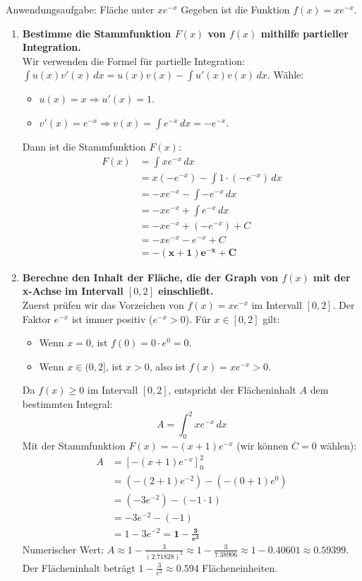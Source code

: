 \begin{loesungsumgebung}{Anwendungsaufgabe: Fläche unter $xe^{-x}$}
Gegeben ist die Funktion $f(x) = xe^{-x}$.

\begin{enumerate}[label=(\alph*)]
    \item \textbf{Bestimme die Stammfunktion $F(x)$ von $f(x)$ mithilfe partieller Integration.} \\
    Wir verwenden die Formel für partielle Integration: $\int u(x)v'(x) \,dx = u(x)v(x) - \int u'(x)v(x) \,dx$.
    Wähle:
    \begin{itemize}
        \item $u(x) = x \Rightarrow u'(x) = 1$.
        \item $v'(x) = e^{-x} \Rightarrow v(x) = \int e^{-x} \,dx = -e^{-x}$.
    \end{itemize}
    Dann ist die Stammfunktion $F(x)$:
    \begin{align*} F(x) &= \int xe^{-x} \,dx \\ &= x(-e^{-x}) - \int 1 \cdot (-e^{-x}) \,dx \\ &= -xe^{-x} - \int -e^{-x} \,dx \\ &= -xe^{-x} + \int e^{-x} \,dx \\ &= -xe^{-x} + (-e^{-x}) + C \\ &= -xe^{-x} - e^{-x} + C \\ &= \mathbf{-(x+1)e^{-x} + C} \end{align*}

    \item \textbf{Berechne den Inhalt der Fläche, die der Graph von $f(x)$ mit der x-Achse im Intervall $[0, 2]$ einschließt.} \\
    Zuerst prüfen wir das Vorzeichen von $f(x) = xe^{-x}$ im Intervall $[0,2]$.
    Der Faktor $e^{-x}$ ist immer positiv ($e^{-x} > 0$).
    Für $x \in [0,2]$ gilt:
    \begin{itemize}
        \item Wenn $x=0$, ist $f(0)=0 \cdot e^0 = 0$.
        \item Wenn $x \in (0,2]$, ist $x > 0$, also ist $f(x) = x e^{-x} > 0$.
    \end{itemize}
    Da $f(x) \ge 0$ im Intervall $[0,2]$, entspricht der Flächeninhalt $A$ dem bestimmten Integral:
    $$ A = \int_0^2 xe^{-x} \,dx $$
    Mit der Stammfunktion $F(x) = -(x+1)e^{-x}$ (wir können $C=0$ wählen):
    \begin{align*} A &= [-(x+1)e^{-x}]_0^2 \\ &= (-(2+1)e^{-2}) - (-(0+1)e^0) \\ &= (-3e^{-2}) - (-1 \cdot 1) \\ &= -3e^{-2} - (-1) \\ &= 1 - 3e^{-2} = \mathbf{1 - \frac{3}{e^2}} \end{align*}
    Numerischer Wert: $A \approx 1 - \frac{3}{(2.71828)^2} \approx 1 - \frac{3}{7.38906} \approx 1 - 0.40601 \approx 0.59399$.
    Der Flächeninhalt beträgt $1 - \frac{3}{e^2} \approx 0.594$ Flächeneinheiten.


\end{enumerate}
\end{loesungsumgebung}
